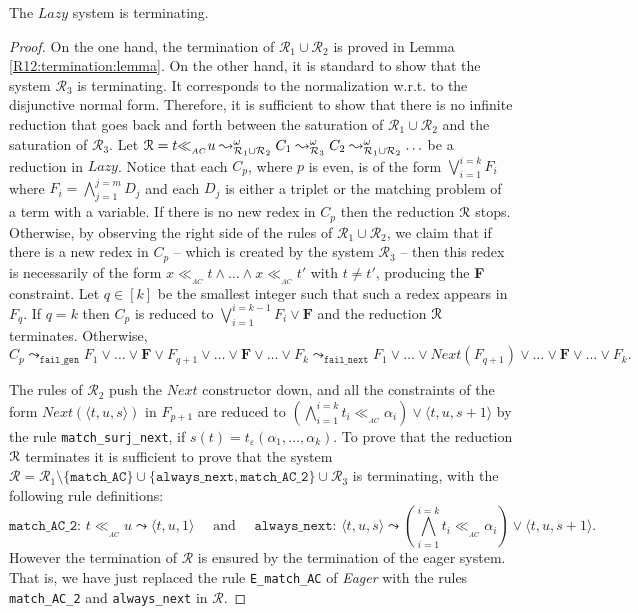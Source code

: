 \documentclass[submission,copyright,creativecommons]{eptcs}
\newcommand \matchth[3]{#1 {\ll}_{{ }_{#3}} {#2}}
\newcommand \matchAC[2]{\matchth{#1}{#2}{AC}}
\newcommand \set[1]{\{#1\}}
\newcommand \trip[1]{\langle #1 \rangle}
\newcommand \Eu[1]{\EuScript{#1}}
\numberwithin{subcase}{case}
\begin{document}
\begin{theorem}
The $\textit{Lazy}$ system  is terminating.
\label{termination:theorem}
\end{theorem}

\begin{proof}
On the one hand, the termination of  $\mathcal{R}_1 \cup \mathcal{R}_2$ is proved
in Lemma \ref{R12:termination:lemma}. On the other hand, it is standard to show
that  the system  $\mathcal{R}_3$ is terminating. It corresponds to the
normalization w.r.t. to the disjunctive normal  form. Therefore, it is sufficient
to  show  that there is no infinite  reduction that goes back and forth between
the saturation of $\mathcal{R}_1\cup \mathcal{R}_2$ and the saturation of
$\mathcal{R}_3$. Let $\Eu{R}=\matchAC{t}{u}\leadsto^{\omega}_{\mathcal{R}_1\cup
\mathcal{R}_2} C_1 \leadsto^{\omega}_{\mathcal{R}_3} C_2
\leadsto^{\omega}_{\mathcal{R}_1\cup \mathcal{R}_2}\ldots$ be a reduction in
$\textit{Lazy}$. Notice that each $C_{p}$, where $p$ is even, is of the form $\bigvee_{i=1}^{i=k}F_i$
where $F_i=\bigwedge_{j=1}^{j=m}D_j$ and each $D_j$ is either a triplet or the
matching problem of a term with a variable. If there is no new redex
in $C_p$ then the reduction  $\Eu{R}$ stops. Otherwise, by observing the right side of the rules of $\mathcal{R}_1\cup
 \mathcal{R}_2$, we claim that if there is a new redex in $C_p$ -- which is
 created by the system $\mathcal{R}_3$ -- then this redex is  necessarily of the form
$\matchAC{x}{t}\land \ldots \land \matchAC{x}{t'}$ with $t\neq t'$, producing
 the \textbf{F} constraint. Let $q \in [k]$ be the smallest integer such that
 such a redex appears in $F_{q}$. If $q=k$ then $C_p$ is reduced to
 $\bigvee_{i=1}^{i=k-1} F_i \lor \textbf{F}$ and the reduction $\Eu{R}$
 terminates. Otherwise, 
$
C_{p} \leadsto_{\texttt{fail\_gen}} 
  F_1 \lor \ldots \lor
\textbf{F}\lor F_{q+1}\lor \ldots \lor \textbf{F}\lor \ldots \lor F_k 
\leadsto_{\texttt{fail\_next}}
F_1 \lor \ldots \lor \textit{Next}(F_{q+1}) \lor \ldots \lor \textbf{F}\lor \ldots \lor F_k.
$

The rules of $\mathcal{R}_2$  push the $\textit{Next}$ constructor down, and all
the  constraints of the form $\textit{Next}(\trip{t,u,s})$  in $F_{p+1}$ are
reduced to $(\bigwedge_{i=1}^{i=k}\matchAC{t_i}{\alpha_i}) \lor
\trip{t,u,{s}+1}$ by the rule \texttt{match\_surj\_next}, if
$s(t)=t_{\varepsilon}(\alpha_1,\ldots,\alpha_k)$. To prove that the reduction
$\Eu{R}$ terminates it is sufficient to prove that the system
$\mathcal{R}=\mathcal{R}_1\setminus\set{\texttt{match\_AC}}\cup
\set{\texttt{always\_next},\texttt{match\_AC\_2}} \cup \mathcal{R}_3$ is
terminating, with the following rule definitions:
$$
\texttt{match\_AC\_2: } \matchAC{t}{u} \leadsto \trip{t,u,1} \quad \textrm{ and 
} \quad \texttt{always\_next: }  \trip{t,u,{s}} \leadsto
(\bigwedge_{i=1}^{i=k}\matchAC{t_i}{\alpha_i}) \lor {\trip{t,u,{s}+1}}
.$$
However the termination of $\mathcal{R}$ is ensured by the termination of  
the eager system. That is, we have just replaced the rule \texttt{E\_match\_AC}
of \textit{Eager} with the rules \texttt{match\_AC\_2} and
\texttt{always\_next} in $\mathcal{R}$.
\end{proof}
\end{document}
